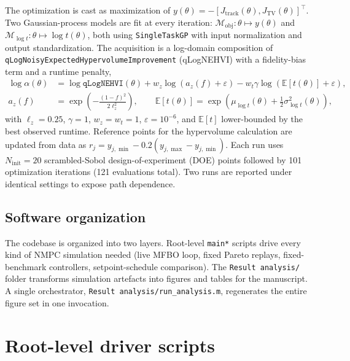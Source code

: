 \documentclass[11pt,a4paper]{article}
\newcommand{\jtrack}{J_{\mathrm{track}}}
\newcommand{\jtv}{J_{\mathrm{TV}}}
\begin{document}
The optimization is cast as maximization of $y(\theta) = -[\jtrack(\theta), \jtv(\theta)]^\top$. Two Gaussian-process models are fit at every iteration: $\mathcal{M}_{\mathrm{obj}}: \theta \mapsto y(\theta)$ and $\mathcal{M}_{\log t}: \theta \mapsto \log t(\theta)$, both using \texttt{SingleTaskGP} with input normalization and output standardization. The acquisition is a log-domain composition of \texttt{qLogNoisyExpectedHypervolumeImprovement} (qLogNEHVI) with a fidelity-bias term and a runtime penalty,
\begin{align}
\log \alpha(\theta) &= \log \texttt{qLogNEHVI}(\theta) + w_z \log(a_z(f) + \varepsilon) - w_t \gamma \log(\mathbb{E}[t(\theta)] + \varepsilon),\\
a_z(f) &= \exp\!\left(-\frac{(1-f)^2}{2 \ell_z^2}\right), \qquad
\mathbb{E}[t(\theta)] = \exp\!\left(\mu_{\log t}(\theta) + \tfrac{1}{2}\sigma^2_{\log t}(\theta)\right),
\end{align}
with $\ell_z = 0.25$, $\gamma = 1$, $w_z = w_t = 1$, $\varepsilon = 10^{-6}$, and $\mathbb{E}[t]$ lower-bounded by the best observed runtime. Reference points for the hypervolume calculation are updated from data as $r_j = y_{j,\min} - 0.2(y_{j,\max} - y_{j,\min})$. Each run uses $N_{\mathrm{init}} = 20$ scrambled-Sobol design-of-experiment (DOE) points followed by 101 optimization iterations (121 evaluations total). Two runs are reported under identical settings to expose path dependence.

\subsection{Software organization}

The codebase is organized into two layers. Root-level \texttt{main*} scripts drive every kind of NMPC simulation needed (live MFBO loop, fixed Pareto replays, fixed-benchmark controllers, setpoint-schedule comparison). The \texttt{Result analysis/} folder transforms simulation artefacts into figures and tables for the manuscript. A single orchestrator, \texttt{Result analysis/run\_analysis.m}, regenerates the entire figure set in one invocation.

\section{Root-level driver scripts}
\label{sec:mainscripts}
\end{document}
